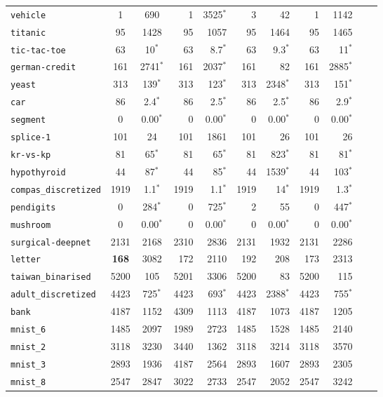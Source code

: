 \begin{tabular}{lccrrrrrrrr}
\texttt{vehicle} & 1 & 690 & 1 & 3525$^*$ & 3 & 42 & 1 & 1142\\
\texttt{titanic} & 95 & 1428 & 95 & 1057 & 95 & 1464 & 95 & 1465\\
\texttt{tic-tac-toe} & 63 & 10$^*$ & 63 & 8.7$^*$ & 63 & 9.3$^*$ & 63 & 11$^*$\\
\texttt{german-credit} & 161 & 2741$^*$ & 161 & 2037$^*$ & 161 & 82 & 161 & 2885$^*$\\
\texttt{yeast} & 313 & 139$^*$ & 313 & 123$^*$ & 313 & 2348$^*$ & 313 & 151$^*$\\
\texttt{car} & 86 & 2.4$^*$ & 86 & 2.5$^*$ & 86 & 2.5$^*$ & 86 & 2.9$^*$\\
\texttt{segment} & 0 & 0.00$^*$ & 0 & 0.00$^*$ & 0 & 0.00$^*$ & 0 & 0.00$^*$\\
\texttt{splice-1} & 101 & 24 & 101 & 1861 & 101 & 26 & 101 & 26\\
\texttt{kr-vs-kp} & 81 & 65$^*$ & 81 & 65$^*$ & 81 & 823$^*$ & 81 & 81$^*$\\
\texttt{hypothyroid} & 44 & 87$^*$ & 44 & 85$^*$ & 44 & 1539$^*$ & 44 & 103$^*$\\
\texttt{compas\_discretized} & 1919 & 1.1$^*$ & 1919 & 1.1$^*$ & 1919 & 14$^*$ & 1919 & 1.3$^*$\\
\texttt{pendigits} & 0 & 284$^*$ & 0 & 725$^*$ & 2 & 55 & 0 & 447$^*$\\
\texttt{mushroom} & 0 & 0.00$^*$ & 0 & 0.00$^*$ & 0 & 0.00$^*$ & 0 & 0.00$^*$\\
\texttt{surgical-deepnet} & 2131 & 2168 & 2310 & 2836 & 2131 & 1932 & 2131 & 2286\\
\texttt{letter} & \textbf{168} & 3082 & 172 & 2110 & 192 & 208 & 173 & 2313\\
\texttt{taiwan\_binarised} & 5200 & 105 & 5201 & 3306 & 5200 & 83 & 5200 & 115\\
\texttt{adult\_discretized} & 4423 & 725$^*$ & 4423 & 693$^*$ & 4423 & 2388$^*$ & 4423 & 755$^*$\\
\texttt{bank} & 4187 & 1152 & 4309 & 1113 & 4187 & 1073 & 4187 & 1205\\
\texttt{mnist\_6} & 1485 & 2097 & 1989 & 2723 & 1485 & 1528 & 1485 & 2140\\
\texttt{mnist\_2} & 3118 & 3230 & 3440 & 1362 & 3118 & 3214 & 3118 & 3570\\
\texttt{mnist\_3} & 2893 & 1936 & 4187 & 2564 & 2893 & 1607 & 2893 & 2305\\
\texttt{mnist\_8} & 2547 & 2847 & 3022 & 2733 & 2547 & 2052 & 2547 & 3242\\

\end{tabular}
